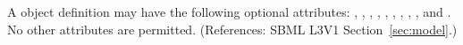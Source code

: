 A \Model object definition may have the following optional attributes:
, , , ,
, , ,
, ,  and
.  No other attributes are permitted.  (References:
SBML L3V1 Section~\ref{sec:model}.)
